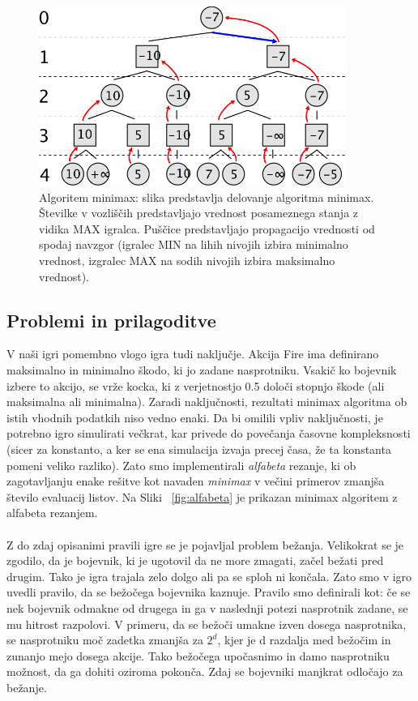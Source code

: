 \documentclass[12pt,a4paper,openany]{book}
\begin{document}
\begin{figure}[ht]
 \centering
 \includegraphics[width=10cm]{svg2raster.png}
 \caption[Algoritem Minimax]{Algoritem minimax: slika predstavlja delovanje algoritma minimax. Številke v vozliščih predstavljajo vrednost posameznega stanja z vidika MAX igralca. Puščice predstavljajo propagacijo vrednosti od spodaj navzgor (igralec MIN na lihih nivojih izbira minimalno vrednost, izgralec MAX na sodih nivojih izbira maksimalno vrednost).}
 \label{fig:minimax}
\end{figure}

\subsection{Problemi in prilagoditve}
V naši igri pomembno vlogo igra tudi naključje. Akcija Fire ima definirano maksimalno in minimalno škodo, ki jo zadane nasprotniku. Vsakič ko bojevnik izbere to akcijo, se vrže kocka, ki z verjetnostjo 0.5 določi stopnjo škode (ali maksimalna ali minimalna). Zaradi naključnosti, rezultati minimax algoritma ob istih vhodnih podatkih niso vedno enaki. Da bi omilili vpliv naključnosti, je potrebno igro simulirati večkrat, kar privede do povečanja časovne kompleksnosti (sicer za konstanto, a ker se ena simulacija izvaja precej časa, že ta konstanta pomeni veliko razliko). Zato smo implementirali \textit{alfabeta} rezanje, ki ob zagotavljanju enake rešitve kot navaden \textit{minimax} v večini primerov zmanjša število evaluacij listov. Na Sliki ~\ref{fig:alfabeta} je prikazan minimax algoritem z alfabeta rezanjem.
\\
\\
Z do zdaj opisanimi pravili igre se je pojavljal problem bežanja. Velikokrat se je zgodilo, da je bojevnik, ki je ugotovil da ne more zmagati, začel bežati pred drugim. Tako je igra trajala zelo dolgo ali pa se sploh ni končala. Zato smo v igro uvedli pravilo, da se bežočega bojevnika kaznuje. Pravilo smo definirali kot: če se nek bojevnik odmakne od drugega in ga v naslednji potezi nasprotnik zadane, se mu hitrost razpolovi. V primeru, da se bežoči umakne izven dosega nasprotnika, se nasprotniku moč zadetka zmanjša za $2^d$, kjer je d razdalja med bežočim in zunanjo mejo dosega akcije. Tako bežočega upočasnimo in damo nasprotniku možnost, da ga dohiti oziroma pokonča. Zdaj se bojevniki manjkrat odločajo za bežanje.
\end{document}
